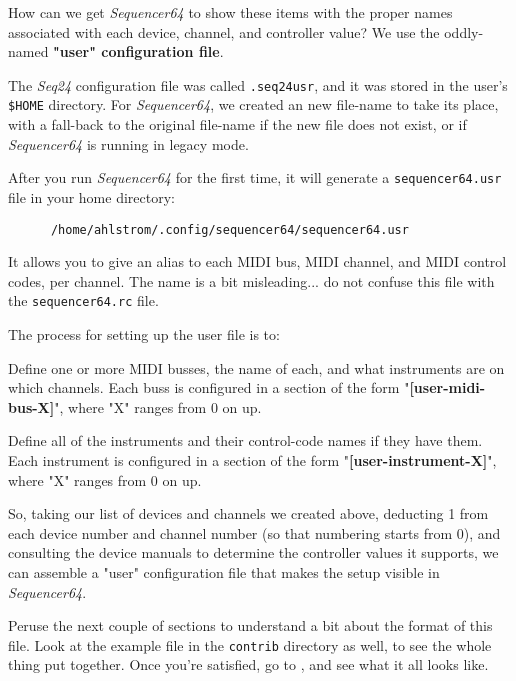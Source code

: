    How can we get \textsl{Sequencer64} to show these items with the proper
   names associated with each device, channel, and controller value?
   We use the oddly-named \textbf{"user" configuration file}.

   The \textsl{Seq24} configuration file was called
   \texttt{.seq24usr}, and it was stored in the user's \texttt{\$HOME}
   directory.
   For \textsl{Sequencer64}, we created an new file-name
   to take its place, with a fall-back to the original file-name if the new
   file does not exist, or if \textsl{Sequencer64} is running in
   legacy mode.

   After you run \textsl{Sequencer64} for the first time, it will generate a
   \texttt{sequencer64.usr} file in your home directory:

   \begin{verbatim}
      /home/ahlstrom/.config/sequencer64/sequencer64.usr
   \end{verbatim}

   It allows you to give an alias to 
   each MIDI bus, MIDI channel, and MIDI control 
   codes, per channel.
   The name is a bit misleading... do not confuse this file with the
   \texttt{sequencer64.rc} file.

   The process for setting up the user file is to:

   \begin{enumber}
      \item Define one or more MIDI busses, the name of each, and what
         instruments are on which channels.  Each buss is configured in a
         section of the form "\textbf{[user-midi-bus-X]}", where "X" ranges
         from 0 on up.
      \item Define all of the instruments and their control-code
         names if they have them.  Each instrument is configured in a
         section of the form "\textbf{[user-instrument-X]}", where "X"
         ranges from 0 on up.
   \end{enumber}

   So, taking our list of devices and channels we created above,
   deducting 1 from each device number and channel number (so that numbering
   starts from 0), and consulting the device manuals to determine the
   controller values it supports, we can assemble a "user" configuration file
   that makes the setup visible in \textsl{Sequencer64}.

   Peruse the next couple of sections to understand a bit about the format of
   this file.  Look at the example file in the \texttt{contrib} directory as
   well, to see the whole thing put together.
   Once you're satisfied, go to
   , and 
   see what it all looks like.

